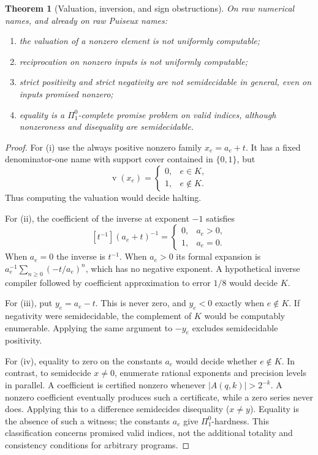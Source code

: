 \documentclass[11pt,letterpaper]{article}
\numberwithin{equation}{section}
\newtheorem{theorem}{Theorem}[section]
\theoremstyle{definition}
\theoremstyle{remark}
\newcommand{\val}{\operatorname{v}}
\newcommand{\coef}[2]{[t^{#1}]#2}
\begin{document}
\begin{theorem}[Valuation, inversion, and sign obstructions]
\label{thm:inversehard}
On raw numerical names, and already on raw Puiseux names:
\begin{enumerate}[label=\textup{(\roman*)},leftmargin=2em]
\item the valuation of a nonzero element is not uniformly computable;
\item reciprocation on nonzero inputs is not uniformly computable;
\item strict positivity and strict negativity are not semidecidable in
general, even on inputs promised nonzero;
\item equality is a $\Pi^0_1$-complete promise problem on valid indices,
although nonzeroness and disequality are semidecidable.
\end{enumerate}
\end{theorem}
\begin{proof}
For (i) use the always positive nonzero family
$x_e=a_e+t$. It has a fixed denominator-one name with support cover
contained in $\{0,1\}$, but
\[
 \val(x_e)=\begin{cases}0,&e\in K,\\1,&e\notin K.\end{cases}
\]
Thus computing the valuation would decide halting.

For (ii), the coefficient of the inverse at exponent $-1$ satisfies
\begin{equation}\label{eq:inversehalting}
 \coef{-1}{(a_e+t)^{-1}}=
 \begin{cases}0,&a_e>0,\\1,&a_e=0.\end{cases}
\end{equation}
When $a_e=0$ the inverse is $t^{-1}$. When $a_e>0$ its formal expansion
is $a_e^{-1}\sum_{n\ge0}(-t/a_e)^n$, which has no negative exponent.
A hypothetical inverse compiler followed by coefficient approximation to
error $1/8$ would decide $K$.

For (iii), put $y_e=a_e-t$. This is never zero, and
$y_e<0$ exactly when $e\notin K$. If negativity were semidecidable, the
complement of $K$ would be computably enumerable. Applying the same
argument to $-y_e$ excludes semidecidable positivity.

For (iv), equality to zero on the constants $a_e$ would decide whether
$e\notin K$. In contrast, to semidecide $x\ne0$, enumerate rational
exponents and precision levels in parallel. A coefficient is certified
nonzero whenever $|A(q,k)|>2^{-k}$. A nonzero coefficient eventually
produces such a certificate, while a zero series never does. Applying this to a difference semidecides
disequality ($x\ne y$). Equality is the absence of such a witness; the constants $a_e$
give $\Pi^0_1$-hardness. This classification concerns promised valid indices,
not the additional totality and consistency conditions for arbitrary programs.
\end{proof}
\end{document}
